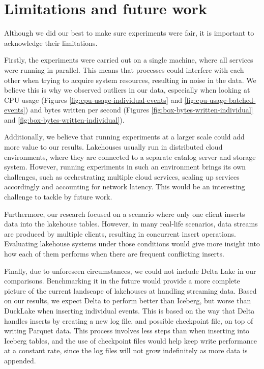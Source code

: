 \section{Limitations and future work}
Although we did our best to make sure experiments were fair, it is important to acknowledge their limitations. 

Firstly, the experiments were carried out on a single machine, where all services were running in parallel. This means that processes could interfere with each other when trying to acquire system resources, resulting in noise in the data. We believe this is why we observed outliers in our data, especially when looking at CPU usage (Figures \ref{fig:cpu-usage-individual-events} and \ref{fig:cpu-usage-batched-events}) and bytes written per second (Figures \ref{fig:box-bytes-written-individual} and \ref{fig:box-bytes-written-individual}).

Additionally, we believe that running experiments at a larger scale could add more value to our results. Lakehouses usually run in distributed cloud environments, where they are connected to a separate catalog server and storage system. However, running experiments in such an environment brings its own challenges, such as orchestrating multiple cloud services, scaling up services accordingly and accounting for network latency. This would be an interesting challenge to tackle by future work.

Furthermore, our research focused on a scenario where only one client inserts data into the lakehouse tables. However, in many real-life scenarios, data streams are produced by multiple clients, resulting in concurrent insert operations. Evaluating lakehouse systems under those conditions would give more insight into how each of them performs when there are frequent conflicting inserts.

Finally, due to unforeseen circumstances, we could not include Delta Lake in our comparisons. Benchmarking it in the future would provide a more complete picture of the current landscape of lakehouses at handling streaming data. Based on our results, we expect Delta to perform better than Iceberg, but worse than DuckLake when inserting individual events. This is based on the way that Delta handles inserts by creating a new log file, and possible checkpoint file, on top of writing Parquet data. This process involves less steps than when inserting into Iceberg tables, and the use of checkpoint files would help keep write performance at a constant rate, since the log files will not grow indefinitely as more data is appended.